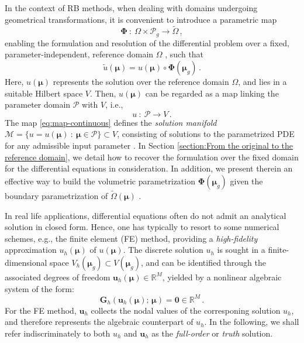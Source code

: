 \documentclass[12pt, a4paper, twoside, openright]{report}
\numberwithin{equation}{chapter}
\theoremstyle{theorem}
\theoremstyle{definition}
\theoremstyle{remark}
\theoremstyle{proposition}
\numberwithin{figure}{chapter}
\newcommand{\wt}[1]{\widetilde{#1}}
\begin{document}
		In the context of RB methods, when dealing with domains undergoing geometrical transformations, it is convenient to introduce a parametric map 
		\begin{equation*}
			\label{eq:geometric-map}
			\boldsymbol{\Phi} ~ : ~ \Omega \times \mathcal{P}_g \rightarrow \wt{\Omega} \, ,
		\end{equation*}
		enabling the formulation and resolution of the differential problem over a fixed, parameter-independent, reference domain $\Omega$ \cite{MN16}, such that 
		\begin{equation*}
			\wt{u}(\boldsymbol{\mu}) = u(\boldsymbol{\mu}) \circ \boldsymbol{\Phi}(\boldsymbol{\mu}_g) \, .
		\end{equation*}
		Here, $u(\boldsymbol{\mu})$ represents the solution over the reference domain $\Omega$, and lies in a suitable Hilbert space $V$. Then, $u(\boldsymbol{\mu})$ can be regarded as a map linking the parameter domain $\mathcal{P}$ with $V$, i.e.,
		\begin{equation}
			\label{eq:map-continuous}
			u ~ : ~ \mathcal{P} \rightarrow V \, .
		\end{equation}
		The map \eqref{eq:map-continuous} defines the \emph{solution manifold} $\mathcal{M} = \big\lbrace u = u(\boldsymbol{\mu}) ~ : ~ \boldsymbol{\mu} \in \mathcal{P} \big\rbrace \subset V$, consisting of solutions to the parametrized PDE for any admissible input parameter \cite{HSR16}. In Section \ref{section:From the original to the reference domain}, we detail how to recover the formulation over the fixed domain for the differential equations in consideration. In addition, we present therein an effective way to build the volumetric parametrization $\boldsymbol{\Phi}(\boldsymbol{\mu}_g)$ given the boundary parametrization of $\wt{\Omega}(\boldsymbol{\mu})$ \cite{JIR14}.
		 
		In real life applications, differential equations often do not admit an analytical solution in closed form. Hence, one has typically to resort to some numerical schemes, e.g., the finite element (FE) method, providing a \emph{high-fidelity} approximation $u_h(\boldsymbol{\mu})$ of $u(\boldsymbol{\mu})$. The discrete solution $u_h$ is sought in a finite-dimensional space $V_h(\boldsymbol{\mu}_g) \subset V(\boldsymbol{\mu}_g)$, and can be identified through the associated degrees of freedom $\mathbf{u}_h(\boldsymbol{\mu}) \in \mathbb{R}^M$, yielded by a nonlinear algebraic system of the form:
		\begin{equation}
			\label{eq:nonlinear-system-full}
			\boldsymbol{G}_h(\mathbf{u}_h(\boldsymbol{\mu}); \, \boldsymbol{\mu}) = \boldsymbol{0} \in \mathbb{R}^M \, .
		\end{equation}
		For the FE method, $\mathbf{u}_h$ collects the nodal values of the corresponing solution $u_h$, and therefore represents the algebraic counterpart of $u_h$. In the following, we shall refer indiscriminately to both $u_h$ and $\mathbf{u}_h$ as the \emph{full-order} or \emph{truth} solution.
		
\end{document}
